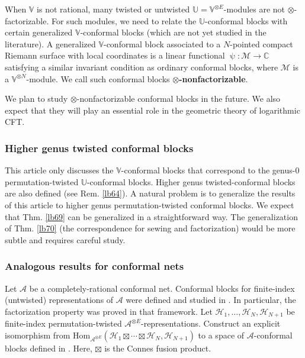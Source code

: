 \documentclass[11pt,b5paper,notitlepage]{article}
\theoremstyle{definition}
\theoremstyle{plain}
\newcommand{\mc}{\mathcal}
\newcommand{\Hom}{\mathrm{Hom}}
\newcommand{\Vbb}{\mathbb V}
\newcommand{\Ubb}{\mathbb U}
\newcommand{\Cbb}{\mathbb C}
\numberwithin{equation}{subsection}
\begin{document}
	

When $\Vbb$ is not rational, many twisted or untwisted  $\Ubb=\Vbb^{\otimes E}$-modules are not $\otimes$-factorizable. For such modules, we need to relate the $\Ubb$-conformal blocks with certain generalized $\Vbb$-conformal blocks (which are not yet studied in the literature). A generalized $\Vbb$-conformal block associated to a $N$-pointed compact Riemann surface with local coordinates is a linear functional $\uppsi:\mc M\rightarrow\Cbb$ satisfying a similar invariant condition as ordinary conformal blocks, where $\mc M$ is a $\Vbb^{\otimes N}$-module. We call such conformal blocks \textbf{$\otimes$-nonfactorizable}. 

We plan to study $\otimes$-nonfactorizable conformal blocks in the future. We also expect that they will play an essential role in the geometric theory of logarithmic CFT.







\subsubsection*{Higher genus twisted conformal blocks}

This article only discusses the $\Vbb$-conformal blocks that correspond to the genus-$0$ permutation-twisted $\Ubb$-conformal blocks. Higher genus twisted-conformal blocks are also defined (see Rem. \ref{lb64}). A natural problem is to generalize the results of this article to higher genus permutation-twisted conformal blocks. We expect that Thm. \ref{lb69} can be generalized in a straightforward way. The generalization of Thm. \ref{lb70} (the correspondence for sewing and factorization) would be more subtle and requires careful study.


\subsubsection*{Analogous results for conformal nets}


Let $\mc A$ be a completely-rational conformal net. Conformal blocks for finite-index (untwisted) representations of $\mc A$ were defined and studied in \cite{BDH17}. In particular, the factorization property was proved in that framework. Let $\mc H_1,\dots,\mc H_N,\mc H_{N+1}$ be finite-index permutation-twisted $\mc A^{\otimes E}$-representations. Construct an explicit isomorphism from $\Hom_{\mc A^{\otimes E}}(\mc H_1\boxtimes\cdots\boxtimes\mc H_N,\mc H_{N+1})$ to a space of $\mc A$-conformal blocks defined in \cite{BDH17}. Here, $\boxtimes$ is the Connes fusion product.
\end{document}
